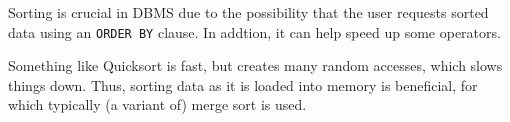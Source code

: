 \label{sec:external-sort}
Sorting is crucial in DBMS due to the possibility that the user requests sorted data using an \texttt{ORDER BY} clause.
In addtion, it can help speed up some operators.

Something like Quicksort is fast, but creates many random accesses, which slows things down.
Thus, sorting data as it is loaded into memory is beneficial, for which typically (a variant of) merge sort is used.

